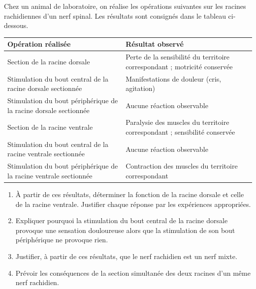 \documentclass[11pt]{article}
\newcounter{popsec}
\newcounter{popsub}
\newcommand{\courssub}[1]{%
  \stepcounter{popsub}%
  \par\vspace{9pt}\noindent{\popxbold\fontsize{11.5}{13}\selectfont\color{popink}{\color{poporange}\thepopsec.\thepopsub}\hspace{6pt}#1}\par\nopagebreak\vspace{4pt}
}
\begin{document}
\courssub{Je m'entraîne}

\begin{exercice}
Chez un animal de laboratoire, on réalise les opérations suivantes sur les racines rachidiennes d'un nerf spinal. Les résultats sont consignés dans le tableau ci-dessous.

\begin{center}
\begin{tabularx}{\linewidth}{|X|X|}
\hline
\rowcolor{popblueL} \textbf{Opération réalisée} & \textbf{Résultat observé} \\
\hline
Section de la racine dorsale & Perte de la sensibilité du territoire correspondant ; motricité conservée \\
\hline
Stimulation du bout central de la racine dorsale sectionnée & Manifestations de douleur (cris, agitation) \\
\hline
Stimulation du bout périphérique de la racine dorsale sectionnée & Aucune réaction observable \\
\hline
Section de la racine ventrale & Paralysie des muscles du territoire correspondant ; sensibilité conservée \\
\hline
Stimulation du bout central de la racine ventrale sectionnée & Aucune réaction observable \\
\hline
Stimulation du bout périphérique de la racine ventrale sectionnée & Contraction des muscles du territoire correspondant \\
\hline
\end{tabularx}
\end{center}

\begin{enumerate}
\item À partir de ces résultats, déterminer la fonction de la racine dorsale et celle de la racine ventrale. Justifier chaque réponse par les expériences appropriées.
\item Expliquer pourquoi la stimulation du bout central de la racine dorsale provoque une sensation douloureuse alors que la stimulation de son bout périphérique ne provoque rien.
\item Justifier, à partir de ces résultats, que le nerf rachidien est un nerf mixte.
\item Prévoir les conséquences de la section simultanée des deux racines d'un même nerf rachidien.
\end{enumerate}
\end{exercice}
\end{document}
